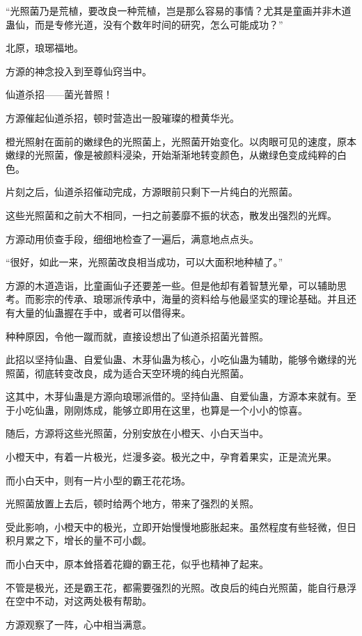 \begin{this_body}
“光照菌乃是荒植，要改良一种荒植，岂是那么容易的事情？尤其是童画并非木道蛊仙，而是专修光道，没有个数年时间的研究，怎么可能成功？”

北原，琅琊福地。

方源的神念投入到至尊仙窍当中。

仙道杀招——菌光普照！

方源催起仙道杀招，顿时营造出一股璀璨的橙黄华光。

橙光照射在面前的嫩绿色的光照菌上，光照菌开始变化。以肉眼可见的速度，原本嫩绿的光照菌，像是被颜料浸染，开始渐渐地转变颜色，从嫩绿色变成纯粹的白色。

片刻之后，仙道杀招催动完成，方源眼前只剩下一片纯白的光照菌。

这些光照菌和之前大不相同，一扫之前萎靡不振的状态，散发出强烈的光辉。

方源动用侦查手段，细细地检查了一遍后，满意地点点头。

“很好，如此一来，光照菌改良相当成功，可以大面积地种植了。”

方源的木道造诣，比童画仙子还要差一些。但是他却有着智慧光晕，可以辅助思考。而影宗的传承、琅琊派传承中，海量的资料给与他最坚实的理论基础。并且还有大量的仙蛊握在手中，或者可以借得来。

种种原因，令他一蹴而就，直接设想出了仙道杀招菌光普照。

此招以坚持仙蛊、自爱仙蛊、木芽仙蛊为核心，小吃仙蛊为辅助，能够令嫩绿的光照菌，彻底转变改良，成为适合天空环境的纯白光照菌。

这其中，木芽仙蛊是方源向琅琊派借的。坚持仙蛊、自爱仙蛊，方源本来就有。至于小吃仙蛊，刚刚炼成，能够立即用在这里，也算是一个小小的惊喜。

随后，方源将这些光照菌，分别安放在小橙天、小白天当中。

小橙天中，有着一片极光，烂漫多姿。极光之中，孕育着果实，正是流光果。

而小白天中，则有一片小型的霸王花花场。

光照菌放置上去后，顿时给两个地方，带来了强烈的关照。

受此影响，小橙天中的极光，立即开始慢慢地膨胀起来。虽然程度有些轻微，但日积月累之下，增长的量不可小觑。

而小白天中，原本耸搭着花瓣的霸王花，似乎也精神了起来。

不管是极光，还是霸王花，都需要强烈的光照。改良后的纯白光照菌，能自行悬浮在空中不动，对这两处极有帮助。

方源观察了一阵，心中相当满意。


\end{this_body}
